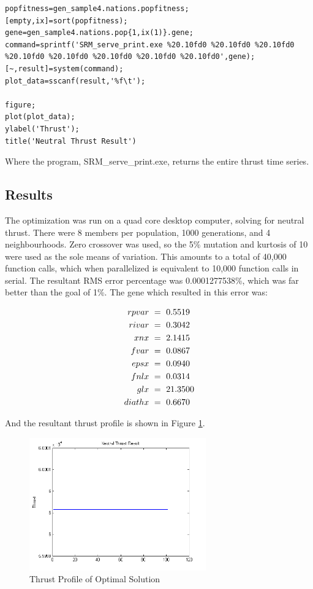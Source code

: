 \documentclass[conference]{IEEEtran}
\begin{document}
\begin{minipage}{0.43\textwidth}
\begin{lstlisting}
popfitness=gen_sample4.nations.popfitness;
[empty,ix]=sort(popfitness);
gene=gen_sample4.nations.pop{1,ix(1)}.gene;
command=sprintf('SRM_serve_print.exe %20.10fd0 %20.10fd0 %20.10fd0 %20.10fd0 %20.10fd0 %20.10fd0 %20.10fd0 %20.10fd0',gene);
[~,result]=system(command);
plot_data=sscanf(result,'%f\t');

figure;
plot(plot_data);
ylabel('Thrust');
title('Neutral Thrust Result')
\end{lstlisting}
\end{minipage}

Where the program, SRM\_serve\_print.exe, returns the entire thrust time series.

\subsection{Results}

The optimization was run on a quad core desktop computer, solving for neutral thrust.  There were 8 members per population, 1000 generations, and 4 neighbourhoods.  Zero crossover was used, so the 5\% mutation and kurtosis of 10 were used as the sole means of variation. This amounts to a total of 40,000 function calls, which when parallelized is equivalent to 10,000 function calls in serial.  The resultant RMS error percentage was 0.0001277538\%, which was far better than the goal of 1\%.  The gene which resulted in this error was:

\begin{align}\notag
rpvar\ &=\ 0.5519\\\notag
 rivar\ &=\ 0.3042\\\notag 
 xnx\ &=\ 2.1415\\\notag
 fvar\ &=\ 0.0867\\\notag
  epsx\ &=\ 0.0940\\\notag
fnlx\ &=\ 0.0314\\\notag
glx\ &=\ 21.3500\\\notag
 diathx\ &=\ 0.6670\notag
 \end{align}

And the resultant thrust profile is shown in Figure \ref{fig:thrust}.

\begin{figure}[h!t]
 \centering
    \includegraphics[width=3in]{thrust.PNG}
    \caption{Thrust Profile of Optimal Solution}
    \label{fig:thrust}
\end{figure}
\end{document}
